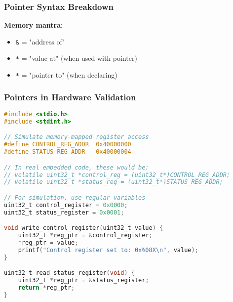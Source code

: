 \documentclass{beamer}
\begin{document}
\begin{frame}
\frametitle{Pointer Syntax Breakdown}
\begin{center}
\end{center}

\vspace{0.5cm}
\textbf{Memory mantra:}
\begin{itemize}
    \item \texttt{\&} = "address of"
    \item \texttt{*} = "value at" (when used with pointer)
    \item \texttt{*} = "pointer to" (when declaring)
\end{itemize}
\end{frame}

\begin{frame}[fragile]
\frametitle{Pointers in Hardware Validation}
\begin{lstlisting}[language=C]
#include <stdio.h>
#include <stdint.h>

// Simulate memory-mapped register access
#define CONTROL_REG_ADDR  0x40000000
#define STATUS_REG_ADDR   0x40000004

// In real embedded code, these would be:
// volatile uint32_t *control_reg = (uint32_t*)CONTROL_REG_ADDR;
// volatile uint32_t *status_reg = (uint32_t*)STATUS_REG_ADDR;

// For simulation, use regular variables
uint32_t control_register = 0x0000;
uint32_t status_register = 0x0001;

void write_control_register(uint32_t value) {
    uint32_t *reg_ptr = &control_register;
    *reg_ptr = value;
    printf("Control register set to: 0x%08X\n", value);
}

uint32_t read_status_register(void) {
    uint32_t *reg_ptr = &status_register;
    return *reg_ptr;
}
\end{lstlisting}
\end{frame}
\end{document}
